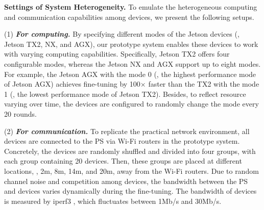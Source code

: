 \textbf{Settings of System Heterogeneity.}
To emulate the heterogeneous computing and communication capabilities among devices, we present the following setups.

(1) \textbf{\textit{{For computing.}}}
By specifying different modes of the Jetson devices (\ie, Jetson TX2, NX, and AGX), our prototype system enables these devices to work with varying computing capabilities.
Specifically, Jetson TX2 offers four configurable modes, whereas the Jetson NX and AGX support up to eight modes.
For example, the Jetson AGX with the mode 0 (\ie, the highest performance mode of Jetson AGX) achieves fine-tuning by 100$\times$ faster than the TX2 with the mode 1 (\ie, the lowest performance mode of Jetson TX2).
Besides, to reflect resource varying over time, the devices are configured to randomly change the mode every 20 rounds.

(2) \textbf{\textit{For communication.}}
To replicate the practical network environment, all devices are connected to the PS via Wi-Fi routers in the prototype system.
Concretely, the devices are randomly shuffled and divided into four groups, with each group containing 20 devices. 
Then, these groups are placed at different locations, \ie, 2m, 8m, 14m, and 20m, away from the Wi-Fi routers.
Due to random channel noise and competition among devices, the bandwidth between the PS and devices varies dynamically during the fine-tuning.
The bandwidth of devices is measured by iperf3 \cite{tirumala1999iperf}, which fluctuates between 1Mb/s and 30Mb/s.

